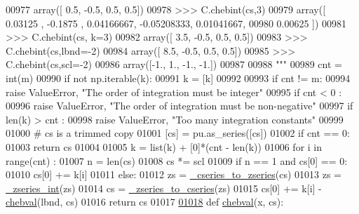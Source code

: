 \begin{DoxyCode}
00977 \textcolor{stringliteral}{    array([ 0.5, -0.5,  0.5,  0.5])}
00978 \textcolor{stringliteral}{    >>> C.chebint(cs,3)}
00979 \textcolor{stringliteral}{    array([ 0.03125   , -0.1875    ,  0.04166667, -0.05208333,  0.01041667,}
00980 \textcolor{stringliteral}{            0.00625   ])}
00981 \textcolor{stringliteral}{    >>> C.chebint(cs, k=3)}
00982 \textcolor{stringliteral}{    array([ 3.5, -0.5,  0.5,  0.5])}
00983 \textcolor{stringliteral}{    >>> C.chebint(cs,lbnd=-2)}
00984 \textcolor{stringliteral}{    array([ 8.5, -0.5,  0.5,  0.5])}
00985 \textcolor{stringliteral}{    >>> C.chebint(cs,scl=-2)}
00986 \textcolor{stringliteral}{    array([-1.,  1., -1., -1.])}
00987 \textcolor{stringliteral}{}
00988 \textcolor{stringliteral}{    """}
00989     cnt = int(m)
00990     \textcolor{keywordflow}{if} \textcolor{keywordflow}{not} np.iterable(k):
00991         k = [k]
00992 
00993     \textcolor{keywordflow}{if} cnt != m:
00994         \textcolor{keywordflow}{raise} ValueError, \textcolor{stringliteral}{"The order of integration must be integer"}
00995     \textcolor{keywordflow}{if} cnt < 0 :
00996         \textcolor{keywordflow}{raise} ValueError, \textcolor{stringliteral}{"The order of integration must be non-negative"}
00997     \textcolor{keywordflow}{if} len(k) > cnt :
00998         \textcolor{keywordflow}{raise} ValueError, \textcolor{stringliteral}{"Too many integration constants"}
00999 
01000     \textcolor{comment}{# cs is a trimmed copy}
01001     [cs] = pu.as\_series([cs])
01002     \textcolor{keywordflow}{if} cnt == 0:
01003         \textcolor{keywordflow}{return} cs
01004 
01005     k = list(k) + [0]*(cnt - len(k))
01006     \textcolor{keywordflow}{for} i \textcolor{keywordflow}{in} range(cnt) :
01007         n = len(cs)
01008         cs *= scl
01009         \textcolor{keywordflow}{if} n == 1 \textcolor{keywordflow}{and} cs[0] == 0:
01010             cs[0] += k[i]
01011         \textcolor{keywordflow}{else}:
01012             zs = \hyperlink{namespacepyneb_1_1utils_1_1chebyshev_a659e346f7cdd9fd058850b26f7e95b17}{\_cseries\_to\_zseries}(cs)
01013             zs = \hyperlink{namespacepyneb_1_1utils_1_1chebyshev_a39d3ae73408fcde399d87f5cfd5e7c98}{\_zseries\_int}(zs)
01014             cs = \hyperlink{namespacepyneb_1_1utils_1_1chebyshev_a2a88474ce0ea12fb26f82b7116752dc1}{\_zseries\_to\_cseries}(zs)
01015             cs[0] += k[i] - \hyperlink{namespacepyneb_1_1utils_1_1chebyshev_a7f7442e9a3a00e1ca04a2283877b15a8}{chebval}(lbnd, cs)
01016     \textcolor{keywordflow}{return} cs
01017 
\hypertarget{chebyshev_8py_source_l01018}{}\hyperlink{namespacepyneb_1_1utils_1_1chebyshev_a7f7442e9a3a00e1ca04a2283877b15a8}{01018} \textcolor{keyword}{def }\hyperlink{namespacepyneb_1_1utils_1_1chebyshev_a7f7442e9a3a00e1ca04a2283877b15a8}{chebval}(x, cs):

\end{DoxyCode}

